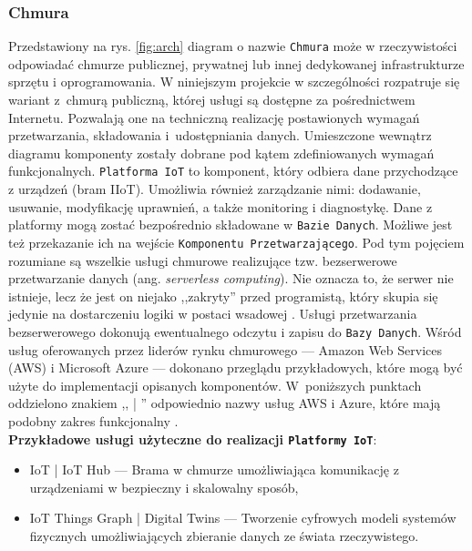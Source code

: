 \documentclass[a4paper, 12pt, twoside]{article}
\begin{document}
\subsubsection{Chmura}\label{cloud-general}
Przedstawiony na rys. \ref{fig:arch} diagram o nazwie \texttt{Chmura}
może w rzeczywistości odpowiadać chmurze publicznej, prywatnej lub innej
dedykowanej infrastrukturze sprzętu i oprogramowania. W niniejszym projekcie
w szczególności rozpatruje się wariant z~chmurą publiczną, której usługi są dostępne
za pośrednictwem Internetu. Pozwalają one na techniczną realizację postawionych
wymagań przetwarzania, składowania i~udostępniania danych.
Umieszczone wewnątrz diagramu komponenty zostały dobrane
pod kątem zdefiniowanych wymagań funkcjonalnych. \texttt{Platforma IoT}
to komponent, który odbiera dane przychodzące z urządzeń (bram IIoT).
Umożliwia również zarządzanie nimi:
dodawanie, usuwanie, modyfikację uprawnień, a także monitoring i diagnostykę.
Dane z platformy mogą zostać bezpośrednio składowane w \texttt{Bazie Danych}.
Możliwe jest też przekazanie ich na wejście \texttt{Komponentu Przetwarzającego}.
Pod tym pojęciem rozumiane są wszelkie usługi chmurowe realizujące tzw. bezserwerowe
przetwarzanie danych (ang. \emph{serverless computing}). Nie oznacza to, że
serwer nie istnieje, lecz że jest on niejako ,,zakryty'' przed programistą, który skupia
się jedynie na dostarczeniu logiki w postaci wsadowej \cite{azure-serverless}.
Usługi przetwarzania bezserwerowego dokonują ewentualnego odczytu i zapisu do \texttt{Bazy Danych}.
Wśród usług oferowanych przez liderów rynku chmurowego
--- Amazon Web Services (AWS) i Microsoft Azure \cite{gartner-cloud-liders}
--- dokonano przeglądu przykładowych, które mogą być użyte do implementacji opisanych komponentów.
W~poniższych punktach oddzielono znakiem ,, | '' odpowiednio nazwy usług AWS i Azure,
które mają podobny zakres funkcjonalny \cite{azure-aws-comparison}.\\

\noindent\textbf{Przykładowe usługi użyteczne do realizacji \texttt{Platformy IoT}}:
\begin{itemize}
      \itemsep0em
      \item IoT | IoT Hub ---  Brama w chmurze umożliwiająca komunikację z
            urządzeniami w bezpieczny i skalowalny sposób,
      \item IoT Things Graph | Digital Twins --- Tworzenie cyfrowych modeli systemów
            fizycznych umożliwiających zbieranie danych ze świata rzeczywistego.
\end{itemize}
\end{document}
